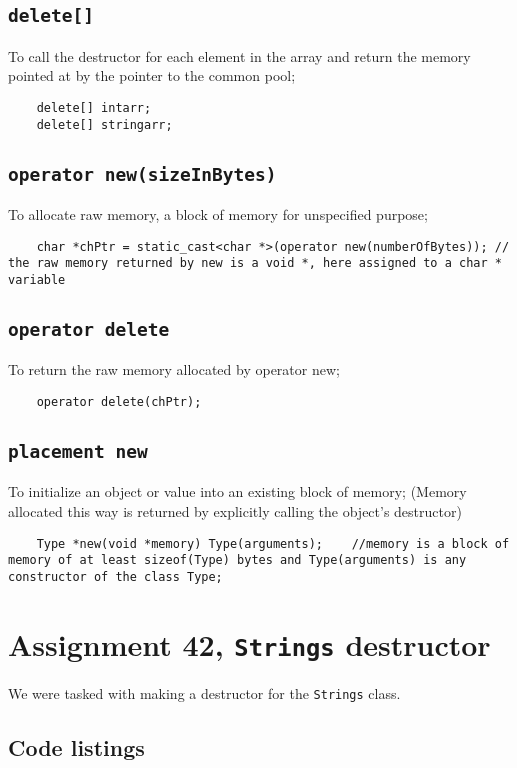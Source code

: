 \documentclass[11pt]{article}
\begin{document}
\subsection{\texttt{delete[]}}
To call the destructor for each element in the array and return the memory pointed at by the pointer to the common pool;
\begin{lstlisting}
	delete[] intarr;
	delete[] stringarr;
\end{lstlisting}

\subsection{\texttt{operator new(sizeInBytes)}}
To allocate raw memory, a block of memory for unspecified purpose;
\begin{lstlisting}	
	char *chPtr = static_cast<char *>(operator new(numberOfBytes)); // the raw memory returned by new is a void *, here assigned to a char * variable
\end{lstlisting}

\subsection{\texttt{operator delete}}
To return the raw memory allocated by operator new;
\begin{lstlisting}
	operator delete(chPtr);
\end{lstlisting}

\subsection{\texttt{placement new}}
To initialize an object or value into an existing block of memory;
(Memory allocated this way is returned by explicitly calling the object's destructor)
\begin{lstlisting}
	Type *new(void *memory) Type(arguments);	//memory is a block of memory of at least sizeof(Type) bytes and Type(arguments) is any constructor of the class Type;
\end{lstlisting}

\section*{Assignment 42, \texttt{Strings} destructor}
We were tasked with making a destructor for the \texttt{Strings} class.

\subsection*{Code listings}
\end{document}
